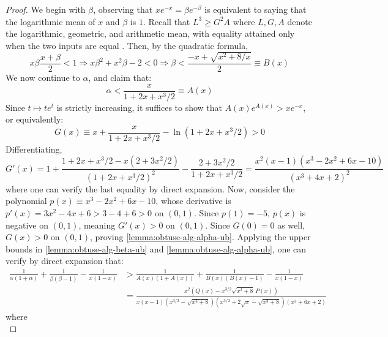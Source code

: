 \documentclass[11pt]{article}
\begin{document}
\begin{proof}
    We begin with $\beta$, observing that $xe^{-x}=\beta e^{-\beta}$ is equivalent to saying that the logarithmic mean of $x$ and $\beta$ is $1$. Recall that $L^3\geq G^2A$ where $L, G, A$ denote the logarithmic, geometric, and arithmetic mean, with equality attained only when the two inputs are equal \citep{leach1983extended}. Then, by the quadratic formula, 
    \begin{equation}\label{lemma:obtuse-alg-beta-ub}
        x\beta \frac{x+\beta}{2}<1\Rightarrow x\beta^2 +x^2\beta -2<0 \Rightarrow \beta < \frac{-x+\sqrt{x^2+8/x}}{2}\equiv B(x)
    \end{equation}
    We now continue to $\alpha$, and claim that:
   \begin{equation}\label{lemma:obtuse-alg-alpha-ub}
       \alpha < \frac{x}{1+2x+x^3/2}\equiv A(x)
   \end{equation} 
    Since $t\mapsto te^t $ is strictly increasing, it suffices to show that $A(x)e^{A(x)}>xe^{-x}$, or equivalently:
    \begin{equation}
        G(x)\equiv x+\frac{x}{1+2x+x^3/2}-\ln (1+2x+x^3/2)>0
    \end{equation}
    Differentiating, 
    \begin{equation}
        G'(x)=1+\frac{1+2x+x^3/2-x(2+3x^2/2)}{(1+2x+x^3/2)^2}-\frac{2+3x^2/2}{1+2x+x^3/2}=\frac{x^2(x-1)(x^3-2x^2+6x-10)}{(x^3+4x+2)^2}
    \end{equation}
    where one can verify the last equality by direct expansion. Now, consider the polynomial $p(x)\equiv x^3-2x^2+6x-10$, whose derivative is $p'(x)=3x^2-4x+6>3-4+6>0$ on $(0,1)$. Since $p(1)=-5$, $p(x)$ is negative on $(0,1)$, meaning $G'(x)>0$ on $(0,1)$. Since $G(0)=0$ as well, $G(x)>0$ on $(0,1)$, proving \eqref{lemma:obtuse-alg-alpha-ub}. Applying the upper bounds in \eqref{lemma:obtuse-alg-beta-ub} and \eqref{lemma:obtuse-alg-alpha-ub}, one can verify by direct expansion that:
    \begin{equation}\label{eq:obtuse-alg-ratx}
    \begin{aligned}
        \frac{1}{\alpha(1+\alpha)}+\frac{1}{\beta(\beta-1)}-\frac{1}{x(1-x)}&>\frac{1}{A(x)(1+A(x))}+\frac{1}{B(x)(B(x)-1)}-\frac{1}{x(1-x)}\\
        &=\frac{x^2(Q(x)-x^{3/2}\sqrt{x^3+8}\,P(x))}{x(x-1)(x^{3/2}-\sqrt{x^3+8})(x^{3/2}+2\sqrt x-\sqrt{x^3+8})(x^3+6x+2)}
    \end{aligned}
    \end{equation}
    where 
    \begin{equation}\label{eq:obtuse-alg-PQ}

\end{equation}
\end{proof}
\end{document}
